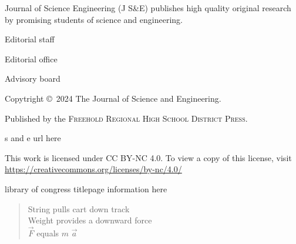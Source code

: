 \documentclass[letterpaper,11pt,twoside,electronic,headers=exceptpdf,papers=countpages,linkcolor=blue]{confproc}
\author{\procpdfauthor}
\title{\procpdftitle}
\date{\today}
\begin{document}
\frontmatter
\setcounter{page}{1}
{}
\newpage
Journal of Science Engineering (J S\&E) publishes high quality original research by promising students of science and engineering. 

Editorial staff

Editorial office

Advisory board

\vfill

Copytright \copyright\ 2024 The Journal of Science and Engineering.

Published by the {\scshape Freehold Regional High School District Press}.

s and e url here

This work is licensed under CC BY-NC 4.0. To view a copy of this license, visit \url{https://creativecommons.org/licenses/by-nc/4.0/}

library of congress titlepage information here


\otherpagestyle
{}
\begingroup
\let\cleardoublepage=\clearpage
\tableofcontents
{}
\vspace*{\fill}
\begin{verse}
String pulls cart down track\\
Weight provides a downward force\\
$\vec{F}$ equals $m$ $\vec{a}$
\end{verse}
\vspace{2ex}\par
{}
\vspace*{\fill}
\endgroup
\end{document}
